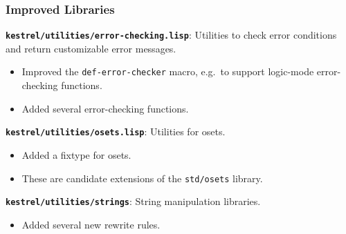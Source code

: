 \documentclass{beamer}
\newcommand{\code}[1]{\texttt{#1}}
\newcommand{\bookpath}[1]{\textbf{\code{#1}}}
\newcommand{\implibtitle}{\frametitle{Improved Libraries}}
\newcommand{\separation}{\vspace*{1ex}}
\begin{document}

\begin{frame}

\implibtitle

\bookpath{kestrel/utilities/error-checking.lisp}:
Utilities to check error conditions and return customizable error messages.
\begin{itemize}
\item
Improved the \code{def-error-checker} macro,
e.g.\ to support logic-mode error-checking functions.
\item
Added several error-checking functions.
\end{itemize}

\separation

\bookpath{kestrel/utilities/osets.lisp}:
Utilities for osets.
\begin{itemize}
\item
Added a fixtype for osets.
\item
These are candidate extensions of the \code{std/osets} library.
\end{itemize}

\separation

\bookpath{kestrel/utilities/strings}:
String manipulation libraries.
\begin{itemize}
\item Added several new rewrite rules.
\end{itemize}

\end{frame}

\end{document}
